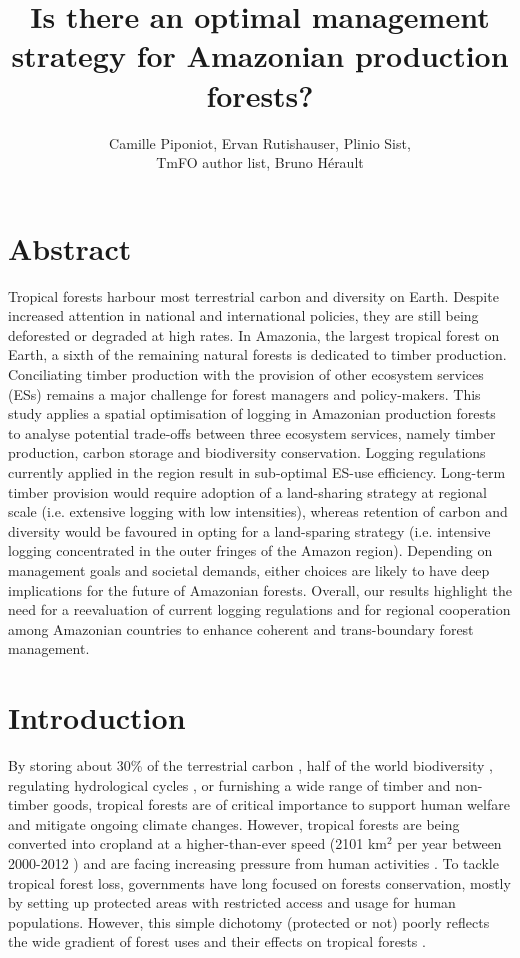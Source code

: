 \documentclass{article}
\title{Is there an optimal management strategy for Amazonian production forests?}
\author{Camille Piponiot, Ervan Rutishauser, Plinio Sist,\\ TmFO author list, Bruno Hérault}
\date{}
\begin{document}
\maketitle 

\section{Abstract}

Tropical forests harbour most terrestrial carbon and diversity on Earth. Despite increased attention in national and international policies, they are still being deforested or degraded at high rates. 
In Amazonia, the largest tropical forest on Earth, a sixth of the remaining natural forests is dedicated to timber production. Conciliating timber production with the provision of other ecosystem services (ESs) remains a major challenge for forest managers and policy-makers. This study applies a spatial optimisation of logging in Amazonian production forests to analyse potential trade-offs between three ecosystem services, namely timber production, carbon storage and biodiversity conservation.  
Logging regulations currently applied in the region result in sub-optimal ES-use efficiency. Long-term timber provision would require adoption of a land-sharing strategy at regional scale (i.e. extensive logging with low intensities), whereas retention of carbon and diversity would be favoured in opting for a land-sparing strategy (i.e. intensive logging concentrated in the outer fringes of the Amazon region). Depending on management goals and societal demands, either choices are likely to have deep implications for the future of Amazonian forests. Overall, our results highlight the need for a reevaluation of current logging regulations and for regional cooperation among Amazonian countries to enhance coherent and trans-boundary forest management.

\twocolumn

\section{Introduction}

By storing about 30\% of the terrestrial carbon \cite{Pan2013}, half of the world biodiversity \cite{Pimm2014}, regulating hydrological cycles \cite{Fisher2009a}, or furnishing a wide range of timber and non-timber goods, tropical forests are of critical importance to support human welfare and mitigate ongoing climate changes. 
However, tropical forests are being converted into cropland at a higher-than-ever speed (2101 km$^2$ per year between 2000-2012 \cite{Hansen2013}) and are facing increasing pressure from human activities \cite{Lewis2015}. 
To tackle tropical forest loss, governments have long focused on forests conservation, mostly by setting up protected areas with restricted access and usage for human populations. However, this simple dichotomy (protected or not) poorly reflects the wide gradient of forest uses and their effects on tropical forests \cite{Gibson2011,DeCastroSolar2015}. 
\end{document}
